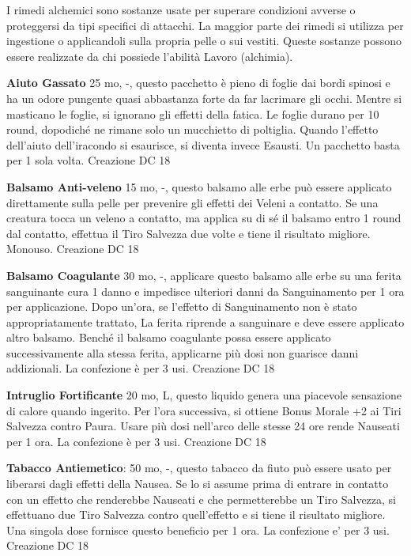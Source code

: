 \documentclass[a4paper,11pt,twoside,openany]{book}
\begin{document}
\label{rimedi-alchemici}

I rimedi alchemici sono sostanze usate per superare condizioni avverse o proteggersi da tipi specifici di attacchi. La maggior parte dei rimedi si utilizza per ingestione o applicandoli sulla propria pelle o sui vestiti. Queste sostanze possono essere realizzate da chi possiede l'abilità Lavoro (alchimia).

\textbf{Aiuto Gassato} 25 mo, -, questo pacchetto è pieno di foglie dai bordi spinosi e ha un odore pungente quasi abbastanza forte da far lacrimare gli occhi. Mentre si masticano le foglie, si ignorano gli effetti della fatica. Le foglie durano per 10 round, dopodiché ne rimane solo un mucchietto di poltiglia.
Quando l'effetto dell'aiuto dell'iracondo si esaurisce, si diventa invece Esausti. Un pacchetto basta per 1 sola volta. Creazione DC 18

\textbf{Balsamo Anti-veleno} 15 mo, -, questo balsamo alle erbe può essere applicato direttamente sulla pelle per prevenire gli effetti dei Veleni a contatto. Se una creatura tocca un veleno a contatto, ma applica su di sé il balsamo entro 1 round dal contatto, effettua il Tiro Salvezza due volte e tiene il risultato migliore. Monouso. Creazione DC 18

\textbf{Balsamo Coagulante} 30 mo, -, applicare questo balsamo alle erbe su una ferita sanguinante cura 1 danno e impedisce ulteriori danni da Sanguinamento per 1 ora per applicazione. Dopo un'ora, se l'effetto di Sanguinamento non è stato appropriatamente trattato,
La ferita riprende a sanguinare e deve essere applicato altro balsamo. Benché il balsamo coagulante possa essere applicato successivamente alla stessa ferita, applicarne più dosi non guarisce danni addizionali. La confezione è per 3 usi. Creazione DC 18

\textbf{Intruglio Fortificante} 20 mo, L, questo liquido genera una piacevole sensazione di calore quando ingerito. Per l'ora successiva, si ottiene Bonus Morale +2 ai Tiri Salvezza contro Paura. Usare più dosi nell'arco delle stesse 24 ore rende Nauseati per 1 ora. La confezione è per 3 usi. Creazione DC 18

\textbf{Tabacco Antiemetico}: 50 mo, -, questo tabacco da fiuto può essere usato per liberarsi dagli effetti della Nausea. Se lo si assume prima di entrare in contatto con un effetto che renderebbe Nauseati e che permetterebbe un Tiro Salvezza, si effettuano due Tiro Salvezza contro quell'effetto e si tiene il risultato migliore. Una singola dose fornisce questo beneficio per 1 ora. La confezione e’ per 3 usi. Creazione DC 18
\end{document}
